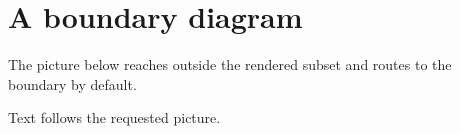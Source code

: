 \documentclass{article}
\begin{document}
\section{A boundary diagram}

The picture below reaches outside the rendered subset and routes to the
boundary by default.


Text follows the requested picture.
\end{document}
